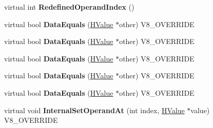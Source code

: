 \begin{DoxyCompactItemize}
\item 
\hypertarget{classv8_1_1internal_1_1_v8___f_i_n_a_l_ae8dec44d4438a5c5137ae8c23a80aa91}{}virtual int {\bfseries Redefined\+Operand\+Index} ()\label{classv8_1_1internal_1_1_v8___f_i_n_a_l_ae8dec44d4438a5c5137ae8c23a80aa91}

\item 
\hypertarget{classv8_1_1internal_1_1_v8___f_i_n_a_l_a7f4d45af1c12067191189fb1f32db617}{}virtual bool {\bfseries Data\+Equals} (\hyperlink{classv8_1_1internal_1_1_h_value}{H\+Value} $\ast$other) V8\+\_\+\+O\+V\+E\+R\+R\+I\+D\+E\label{classv8_1_1internal_1_1_v8___f_i_n_a_l_a7f4d45af1c12067191189fb1f32db617}

\item 
\hypertarget{classv8_1_1internal_1_1_v8___f_i_n_a_l_a7f4d45af1c12067191189fb1f32db617}{}virtual bool {\bfseries Data\+Equals} (\hyperlink{classv8_1_1internal_1_1_h_value}{H\+Value} $\ast$other) V8\+\_\+\+O\+V\+E\+R\+R\+I\+D\+E\label{classv8_1_1internal_1_1_v8___f_i_n_a_l_a7f4d45af1c12067191189fb1f32db617}

\item 
\hypertarget{classv8_1_1internal_1_1_v8___f_i_n_a_l_a7f4d45af1c12067191189fb1f32db617}{}virtual bool {\bfseries Data\+Equals} (\hyperlink{classv8_1_1internal_1_1_h_value}{H\+Value} $\ast$other) V8\+\_\+\+O\+V\+E\+R\+R\+I\+D\+E\label{classv8_1_1internal_1_1_v8___f_i_n_a_l_a7f4d45af1c12067191189fb1f32db617}

\item 
\hypertarget{classv8_1_1internal_1_1_v8___f_i_n_a_l_a7f4d45af1c12067191189fb1f32db617}{}virtual bool {\bfseries Data\+Equals} (\hyperlink{classv8_1_1internal_1_1_h_value}{H\+Value} $\ast$other) V8\+\_\+\+O\+V\+E\+R\+R\+I\+D\+E\label{classv8_1_1internal_1_1_v8___f_i_n_a_l_a7f4d45af1c12067191189fb1f32db617}

\item 
\hypertarget{classv8_1_1internal_1_1_v8___f_i_n_a_l_a7f4d45af1c12067191189fb1f32db617}{}virtual bool {\bfseries Data\+Equals} (\hyperlink{classv8_1_1internal_1_1_h_value}{H\+Value} $\ast$other) V8\+\_\+\+O\+V\+E\+R\+R\+I\+D\+E\label{classv8_1_1internal_1_1_v8___f_i_n_a_l_a7f4d45af1c12067191189fb1f32db617}

\item 
\hypertarget{classv8_1_1internal_1_1_v8___f_i_n_a_l_a38952305f91686c7dfc731fc86554988}{}virtual void {\bfseries Internal\+Set\+Operand\+At} (int index, \hyperlink{classv8_1_1internal_1_1_h_value}{H\+Value} $\ast$value) V8\+\_\+\+O\+V\+E\+R\+R\+I\+D\+E\label{classv8_1_1internal_1_1_v8___f_i_n_a_l_a38952305f91686c7dfc731fc86554988}


\end{DoxyCompactItemize}

